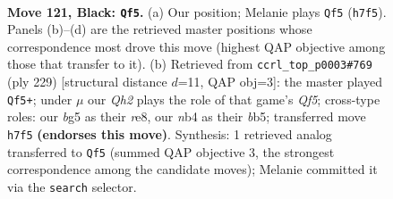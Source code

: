 \documentclass[11pt]{article}
\begin{document}
\clearpage

\begin{figure}[p]\centering
\begin{subfigure}{0.46\textwidth}\centering
\resizebox{\linewidth}{!}{%
\newchessgame
\chessboard[
  setfen={8/2k4q/8/6B1/KN6/8/8/8 b - - 11 121},
  showmover=false,
  pgfstyle=straightmove, color=movearrow, markmove={h7-f5}
]}
\caption{}
\end{subfigure}\hfill
\begin{subfigure}{0.46\textwidth}\centering
\resizebox{\linewidth}{!}{%
\newchessgame
\chessboard[
  setfen={4R3/8/3k4/1B6/5q2/2N5/2K5/8 b - - 30 115},
  showmover=false,
  pgfstyle=straightmove, color=movearrow, markmove={f4-f5}
]}
\caption{}
\end{subfigure}
\\[4pt]

\caption{\textbf{Move 121, Black: \texttt{Qf5}.} (a) Our position; Melanie plays \texttt{Qf5} (\texttt{h7f5}). Panels (b)--(d) are the retrieved master positions whose correspondence most drove this move (highest QAP objective among those that transfer to it). (b) Retrieved from \texttt{ccrl\_top\_p0003\#769} (ply 229) [structural distance $d$=11, QAP obj=3]: the master played \texttt{Qf5+}; under $\mu$ our \emph{Qh2} plays the role of that game's \emph{Qf5}; cross-type roles: our \emph{b}g5 as their \emph{r}e8, our \emph{n}b4 as their \emph{b}b5; transferred move \texttt{h7f5} \textbf{(endorses this move)}. Synthesis: 1 retrieved analog transferred to \texttt{Qf5} (summed QAP objective 3, the strongest correspondence among the candidate moves); Melanie committed it via the \texttt{search} selector.}
\label{fig:thought-m241}
\end{figure}

\clearpage
\end{document}
